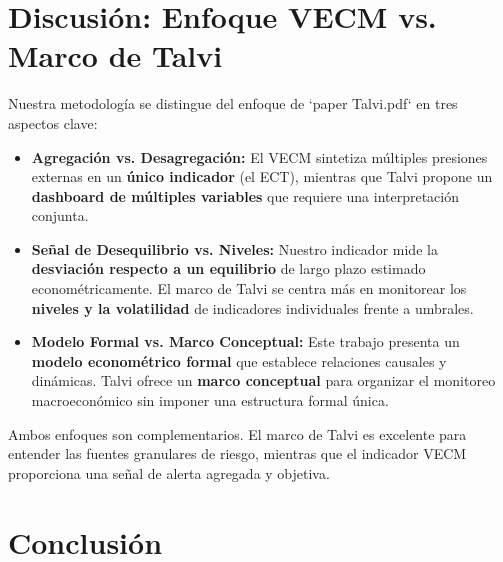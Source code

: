 \documentclass[12pt, a4paper]{article}
\begin{document}
\section{Discusión: Enfoque VECM vs. Marco de Talvi}
Nuestra metodología se distingue del enfoque de `paper Talvi.pdf` en tres aspectos clave:
\begin{itemize}
    \item \textbf{Agregación vs. Desagregación:} El VECM sintetiza múltiples presiones externas en un \textbf{único indicador} (el ECT), mientras que Talvi propone un \textbf{dashboard de múltiples variables} que requiere una interpretación conjunta.
    \item \textbf{Señal de Desequilibrio vs. Niveles:} Nuestro indicador mide la \textbf{desviación respecto a un equilibrio} de largo plazo estimado econométricamente. El marco de Talvi se centra más en monitorear los \textbf{niveles y la volatilidad} de indicadores individuales frente a umbrales.
    \item \textbf{Modelo Formal vs. Marco Conceptual:} Este trabajo presenta un \textbf{modelo econométrico formal} que establece relaciones causales y dinámicas. Talvi ofrece un \textbf{marco conceptual} para organizar el monitoreo macroeconómico sin imponer una estructura formal única.
\end{itemize}
Ambos enfoques son complementarios. El marco de Talvi es excelente para entender las fuentes granulares de riesgo, mientras que el indicador VECM proporciona una señal de alerta agregada y objetiva.

\section{Conclusión}
\end{document}
